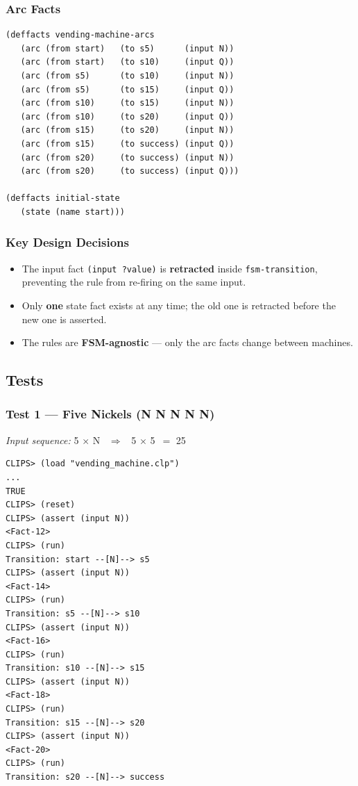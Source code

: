\documentclass[12pt,a4paper]{article}
\begin{document}
\subsubsection*{Arc Facts}

\begin{lstlisting}[style=clipsStyle]
(deffacts vending-machine-arcs
   (arc (from start)   (to s5)      (input N))
   (arc (from start)   (to s10)     (input Q))
   (arc (from s5)      (to s10)     (input N))
   (arc (from s5)      (to s15)     (input Q))
   (arc (from s10)     (to s15)     (input N))
   (arc (from s10)     (to s20)     (input Q))
   (arc (from s15)     (to s20)     (input N))
   (arc (from s15)     (to success) (input Q))
   (arc (from s20)     (to success) (input N))
   (arc (from s20)     (to success) (input Q)))

(deffacts initial-state
   (state (name start)))
\end{lstlisting}

\subsubsection*{Key Design Decisions}

\begin{itemize}
  \item The input fact \texttt{(input ?value)} is \textbf{retracted} inside
        \texttt{fsm-transition}, preventing the rule from re-firing on the
        same input.
  \item Only \textbf{one} state fact exists at any time; the old one is
        retracted before the new one is asserted.
  \item The rules are \textbf{FSM-agnostic} --- only the arc facts change
        between machines.
\end{itemize}

\subsection*{Tests}

\subsubsection*{Test 1 --- Five Nickels (N N N N N)}

\textit{Input sequence:} 5 $\times$ N \ $\Rightarrow$ \ 5 $\times$ 5\textcent\ $=$ 25\textcent

\begin{lstlisting}[style=terminalStyle]
CLIPS> (load "vending_machine.clp")
...
TRUE
CLIPS> (reset)
CLIPS> (assert (input N))
<Fact-12>
CLIPS> (run)
Transition: start --[N]--> s5
CLIPS> (assert (input N))
<Fact-14>
CLIPS> (run)
Transition: s5 --[N]--> s10
CLIPS> (assert (input N))
<Fact-16>
CLIPS> (run)
Transition: s10 --[N]--> s15
CLIPS> (assert (input N))
<Fact-18>
CLIPS> (run)
Transition: s15 --[N]--> s20
CLIPS> (assert (input N))
<Fact-20>
CLIPS> (run)
Transition: s20 --[N]--> success
\end{lstlisting}
\end{document}
